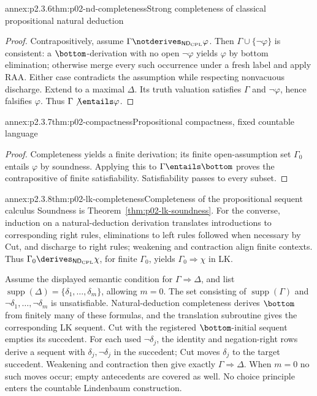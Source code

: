 \begin{annexitem}{annex:p2.3.6}{thm:p02-nd-completeness}{Strong completeness of classical propositional natural deduction}
\begin{proof}
Contrapositively, assume
\(\Gamma\notderives_{\mathsf{ND}_{\mathrm{CPL}}}\varphi\).  Then
\(\Gamma\cup\{\neg\varphi\}\) is consistent: a \(\bottom\)-derivation with
no open \(\neg\varphi\) yields \(\varphi\) by bottom elimination; otherwise
merge every such occurrence under a fresh label and apply RAA.  Either case
contradicts the assumption while respecting nonvacuous discharge.  Extend to
a maximal \(\Delta\).  Its truth valuation satisfies \(\Gamma\) and
\(\neg\varphi\), hence falsifies \(\varphi\).  Thus
\(\Gamma\not\entails\varphi\).
\end{proof}
\end{annexitem}

\begin{annexitem}{annex:p2.3.7}{thm:p02-compactness}{Propositional compactness, fixed countable language}
\begin{proof}
Completeness yields a finite derivation; its finite open-assumption set
\(\Gamma_0\) entails \(\varphi\) by soundness.  Applying this to
\(\Gamma\entails\bottom\) proves the contrapositive of finite
satisfiability.  Satisfiability passes to every subset.
\end{proof}
\end{annexitem}

\begin{annexitem}{annex:p2.3.8}{thm:p02-lk-completeness}{Completeness of the propositional sequent calculus}
Soundness is Theorem~\ref{thm:p02-lk-soundness}.  For the converse, induction
on a natural-deduction derivation translates introductions to corresponding
right rules, eliminations to left rules followed when necessary by Cut, and
discharge to right rules; weakening and contraction align finite contexts.
Thus \(\Gamma_0\derives_{\mathsf{ND}_{\mathrm{CPL}}}\chi\), for finite
\(\Gamma_0\), yields \(\Gamma_0\Rightarrow\chi\) in LK.

Assume the displayed semantic condition for \(\Gamma\Rightarrow\Delta\),
and list \(\operatorname{supp}(\Delta)=\{\delta_1,\ldots,\delta_m\}\),
allowing \(m=0\).  The set consisting of
\(\operatorname{supp}(\Gamma)\) and
\(\neg\delta_1,\ldots,\neg\delta_m\) is unsatisfiable.  Natural-deduction
completeness derives \(\bottom\) from finitely many of these formulas, and
the translation subroutine gives the corresponding LK sequent.  Cut with the
registered \(\bottom\)-initial sequent empties its succedent.  For each used
\(\neg\delta_j\), the identity and negation-right rows derive a sequent with
\(\delta_j,\neg\delta_j\) in the succedent; Cut moves \(\delta_j\) to the
target succedent.  Weakening and contraction then give exactly
\(\Gamma\Rightarrow\Delta\).  When \(m=0\) no such moves occur; empty
antecedents are covered as well.  No choice principle enters the countable
Lindenbaum construction.
\end{annexitem}

